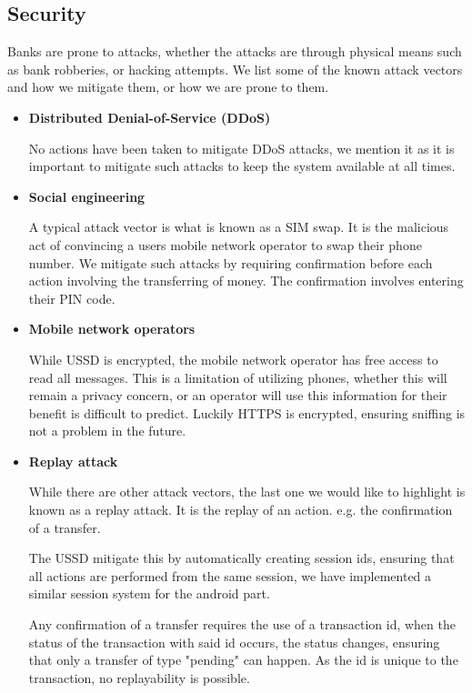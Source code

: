 \documentclass[11pt, a4paper]{article}
\begin{document}
\subsection{Security} %
\label{sub:attack_vectors}
Banks are prone to attacks, whether the attacks are through physical means such as bank robberies, or hacking attempts. We list some of the known attack vectors and how we mitigate them, or how we are prone to them.

\begin{itemize}
  \item \textbf{Distributed Denial-of-Service (DDoS)}

  No actions have been taken to mitigate DDoS attacks, we mention it as it is important to mitigate such attacks to keep the system available at all times.
  \item \textbf{Social engineering}

  A typical attack vector is what is known as a SIM swap. It is the malicious act of convincing a users mobile network operator to swap their phone number. We mitigate such attacks by requiring confirmation before each action involving the transferring of money. The confirmation involves entering their PIN code.
  \item \textbf{Mobile network operators}

  While USSD is encrypted, the mobile network operator has free access to read all messages. This is a limitation of utilizing phones, whether this will remain a privacy concern, or an operator will use this information for their benefit is difficult to predict. Luckily HTTPS is encrypted, ensuring sniffing is not a problem in the future.
  \item \textbf{Replay attack}

  While there are other attack vectors, the last one we would like to highlight is known as a replay attack. It is the replay of an action. e.g. the confirmation of a transfer.

  The USSD mitigate this by automatically creating session ids, ensuring that all actions are performed from the same session, we have implemented a similar session system for the android part.

  Any confirmation of a transfer requires the use of a transaction id, when the status of the transaction with said id occurs, the status changes, ensuring that only a transfer of type "pending" can happen. As the id is unique to the transaction, no replayability is possible.
\end{itemize}
\end{document}
